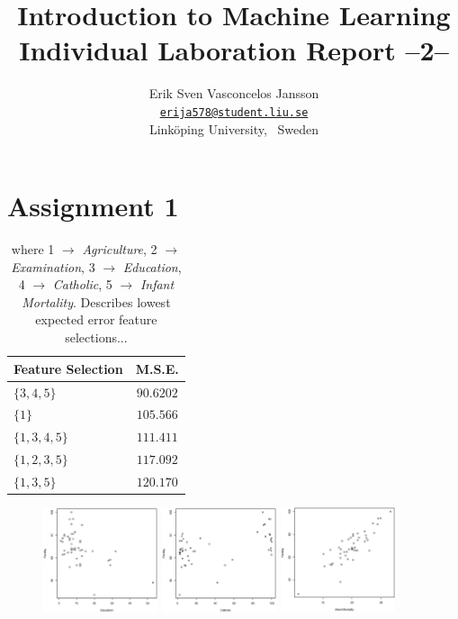 \documentclass[a4paper, twocolumn]{article}
\title{Introduction to Machine Learning \\
       Individual Laboration Report --2--}
\author{{Erik Sven Vasconcelos Jansson} \\
        {\href{mailto:erija578@student.liu.se}
        {\texttt{erija578@student.liu.se}}} \\
        {Linköping University, \, Sweden}}
\begin{document}
    \maketitle %

    \section*{Assignment 1}

    \begin{table}[h!]
    \begin{center}
    \begin{tabular}{lc}
        \toprule
            \textbf{Feature Selection} & \textbf{M.S.E.} \\
        \midrule
            $\{3, 4, 5\}$ & $90.6202$ \\
            $\{1\}$ & $105.566$ \\
            $\{1, 3, 4, 5\}$ & $111.411$ \\
            $\{1, 2, 3, 5\}$ & $117.092$ \\
            $\{1, 3, 5\}$ & $120.170$ \\
        \bottomrule
    \end{tabular}
    \end{center}
    \label{tbl:featsel}
    \caption{where 1 $\rightarrow$ \emph{Agriculture}, 2 $\rightarrow$ \emph{Examination}, 3 $\rightarrow$ \emph{Education}, 4 $\rightarrow$ \emph{Catholic}, 5 $\rightarrow$ \emph{Infant Mortality}. Describes lowest expected error feature selections...}
    \end{table}

    \newpage

    \begin{figure}[h!]
        \centering
        \includegraphics[width=0.3\textwidth]{share/education.eps}
        \includegraphics[width=0.3\textwidth]{share/catholic.eps}
        \includegraphics[width=0.3\textwidth]{share/mortality.eps}
    \end{figure}
\end{document}
